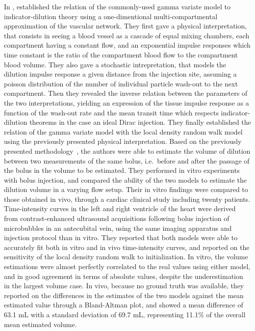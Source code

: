 In \citeyear{Mischi:2008fe}, \citet{Mischi:2008fe} established the relation of the commonly-used gamma variate model to indicator-dilution theory using a one-dimentional multi-compartmental approximation of the vascular network.
They first gave a physical interpretation, that consists in seeing a blood vessel as a cascade of equal mixing chambers, each compartment having a constant flow, and an exponential impulse responses which time constant is the ratio of the compartment blood flow to the compartment blood volume.
They also gave a stochastic intrepretation, that models the dilution impulse response a given distance from the injection site, assuming a poisson distribution of the number of individual particle wash-out to the next compartment.
Then they revealed the inverse relation between the parameters of the two interpretations, yielding an expression of the tissue impulse response as a function of the wash-out rate and the mean transit time which respects indicator-dilution theorems in the case an ideal Dirac injection.
They finally established the relation of the gamma variate model with the local density random walk model using the previously presented physical interpretation.
Based on the previously presented methodology~\cite{Mischi:2004cn}, the authors were able to estimate the volume of dilution between two measurements of the same bolus, i.e.~before and after the passage of the bolus in the volume to be estimated.
They performed in vitro experiments with bolus injection, and compared the ability of the two models to estimate the dilution volume in a varying flow setup.
Their in vitro findings were compared to those obtained in vivo, through a cardiac clinical study including twenty patients.
Time-intensity curves in the left and right ventricle of the heart were derived from contrast-enhanced ultrasound acquisitions following bolus injection of microbubbles in an antecubital vein, using the same imaging apparatus and injection protocol than in vitro.
They reported that both models were able to accurately fit both in vitro and in vivo time-intensity curves, and reported on the sensitivity of the local density random walk to initialization.
In vitro, the volume estimations were almost perfectly correlated to the real values using either model, and in good agreement in terms of absolute values, despite the underestimation in the largest volume case.
In vivo, because no ground truth was available, they reported on the differences in the estimates of the two models against the mean estimated value through a Bland-Altman plot, and showed a mean difference of 63.1 mL with a standard deviation of 69.7 mL, representing 11.1\% of the overall mean estimated volume.

